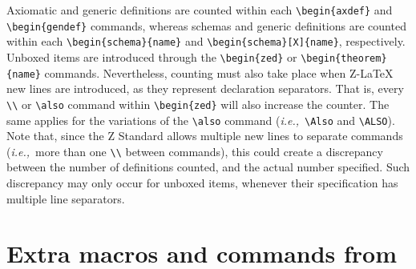 \documentclass{article}
\begin{document}
Axiomatic and generic definitions are counted within each \verb|\begin{axdef}| and \verb|\begin{gendef}| commands,
whereas schemas and generic definitions are counted within each \verb|\begin{schema}{name}| and
\verb|\begin{schema}[X]{name}|, respectively. Unboxed items are introduced through the \verb|\begin{zed}| or
\verb|\begin{theorem}{name}| commands. Nevertheless, counting must also take place when Z-\LaTeX{} new lines are introduced,
as they represent declaration separators. That is, every \verb|\\| or \verb|\also| command within \verb|\begin{zed}| will
also increase the counter. The same applies for the variations of the \verb|\also| command (\textit{i.e.,}~\verb|\Also| and
\verb|\ALSO|). Note that, since the Z Standard allows multiple new lines to separate commands (\textit{i.e.,}~more than one
\verb|\\| between commands), this could create a discrepancy between the number of definitions counted, and the actual number
specified. Such discrepancy may only occur for unboxed items, whenever their specification has multiple line separators.

\section{Extra macros and commands from \cztstylefile}\label{sec:cztsty}
\end{document}
